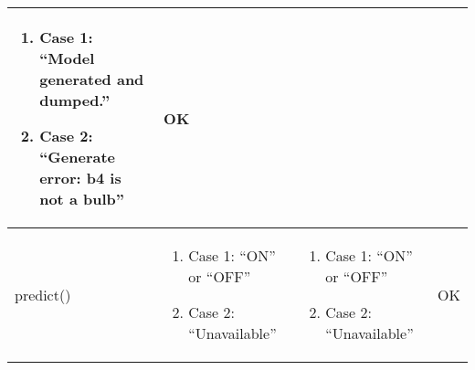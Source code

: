 \begin{tabular}{|p{2.25cm}|p{5cm}|p{5cm}|p{1.25cm}|}
\begin{enumerate}
\item[] \hspace*{-1cm}Case 1: ``Model generated and dumped.''
\item[] \hspace*{-1cm}Case 2: ``Generate error: b4 is not a bulb''
\end{enumerate} & \vspace*{\baselineskip}OK \\
\hline
\vspace*{\baselineskip}predict() & \begin{enumerate}
\item[] \hspace*{-1cm}Case 1: ``ON'' or ``OFF''
\item[] \hspace*{-1cm}Case 2: ``Unavailable''
\end{enumerate} & \begin{enumerate}
\item[] \hspace*{-1cm}Case 1: ``ON'' or ``OFF''
\item[] \hspace*{-1cm}Case 2: ``Unavailable''
\end{enumerate} & \vspace*{\baselineskip}OK \\
\hline
\end{tabular}